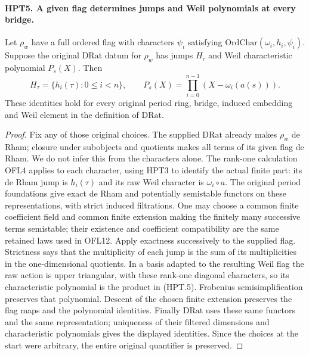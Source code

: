 \documentclass[11pt,a4paper]{article}
\numberwithin{equation}{section}
\theoremstyle{remark}\newtheorem{remark}[theorem]{Remark}
\begin{document}
\paragraph{HPT5. A given flag determines jumps and Weil polynomials at every bridge.}
\label{claim:HPT5}
Let $\rho_w$ have a full ordered flag with characters $\psi_i$
satisfying $\mathrm{OrdChar}(\omega_i,h_i,\psi_i)$.
Suppose the original $\mathrm{DRat}$ datum for $\rho_w$ has jumps
$H_\tau$ and Weil characteristic polynomial $P_s(X)$.
Then
\[
 H_\tau=\{h_i(\tau):0\leq i<n\},\qquad
 P_s(X)=\prod_{i=0}^{n-1}(X-\omega_i(a(s))).                    \tag{HPT.5}
\]
These identities hold for every original period ring, bridge,
induced embedding and Weil element in the definition of
$\mathrm{DRat}$.
\begin{proof}
Fix any of those original choices.  The supplied $\mathrm{DRat}$
already makes $\rho_w$ de Rham; closure under subobjects and
quotients makes all terms of its given flag de Rham.  We do not
infer this from the characters alone.  The rank-one calculation OFL4
applies to each character, using HPT3 to identify the actual finite
part: its de Rham jump is $h_i(\tau)$ and its raw Weil character is
$\omega_i\circ a$.  The original period foundations give exact
de Rham and potentially semistable functors on these representations,
with strict induced filtrations.  One may choose a common finite
coefficient field and common finite extension making the finitely
many successive terms semistable; their existence and coefficient
compatibility are the same retained laws used in OFL12.
Apply exactness successively to the supplied flag.  Strictness says
that the multiplicity of each jump is the sum of its multiplicities
in the one-dimensional quotients.  In a basis adapted to the
resulting Weil flag the raw action is upper triangular, with these
rank-one diagonal characters, so its characteristic polynomial is
the product in (HPT.5).  Frobenius semisimplification preserves that
polynomial.  Descent of the chosen finite extension preserves the
flag maps and the polynomial identities.  Finally $\mathrm{DRat}$
uses these same functors and the same representation; uniqueness
of their filtered dimensions and characteristic polynomials gives
the displayed identities.  Since the choices at the start were
arbitrary, the entire original quantifier is preserved.
\end{proof}

\end{document}
